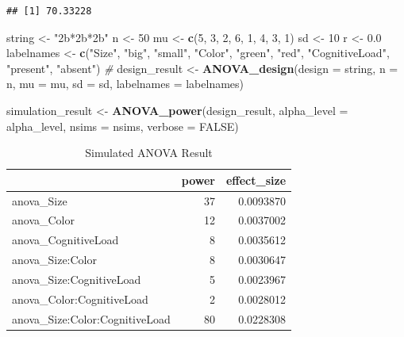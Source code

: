 \documentclass[]{book}
\newenvironment{Shaded}{\begin{snugshade}}{\end{snugshade}}
\newcommand{\CommentTok}[1]{\textcolor[rgb]{0.56,0.35,0.01}{\textit{#1}}}
\newcommand{\DataTypeTok}[1]{\textcolor[rgb]{0.13,0.29,0.53}{#1}}
\newcommand{\DecValTok}[1]{\textcolor[rgb]{0.00,0.00,0.81}{#1}}
\newcommand{\FloatTok}[1]{\textcolor[rgb]{0.00,0.00,0.81}{#1}}
\newcommand{\KeywordTok}[1]{\textcolor[rgb]{0.13,0.29,0.53}{\textbf{#1}}}
\newcommand{\NormalTok}[1]{#1}
\newcommand{\OtherTok}[1]{\textcolor[rgb]{0.56,0.35,0.01}{#1}}
\newcommand{\StringTok}[1]{\textcolor[rgb]{0.31,0.60,0.02}{#1}}
\begin{document}
\begin{verbatim}
## [1] 70.33228
\end{verbatim}

\begin{Shaded}
\begin{Highlighting}[]
\NormalTok{string <-}\StringTok{ "2b*2b*2b"}
\NormalTok{n <-}\StringTok{ }\DecValTok{50}
\NormalTok{mu <-}\StringTok{ }\KeywordTok{c}\NormalTok{(}\DecValTok{5}\NormalTok{, }\DecValTok{3}\NormalTok{, }\DecValTok{2}\NormalTok{, }\DecValTok{6}\NormalTok{, }\DecValTok{1}\NormalTok{, }\DecValTok{4}\NormalTok{, }\DecValTok{3}\NormalTok{, }\DecValTok{1}\NormalTok{) }
\NormalTok{sd <-}\StringTok{ }\DecValTok{10}
\NormalTok{r <-}\StringTok{ }\FloatTok{0.0}
\NormalTok{labelnames <-}\StringTok{ }\KeywordTok{c}\NormalTok{(}\StringTok{"Size"}\NormalTok{, }\StringTok{"big"}\NormalTok{, }\StringTok{"small"}\NormalTok{, }\StringTok{"Color"}\NormalTok{, }\StringTok{"green"}\NormalTok{, }\StringTok{"red"}\NormalTok{, }
                \StringTok{"CognitiveLoad"}\NormalTok{, }\StringTok{"present"}\NormalTok{, }\StringTok{"absent"}\NormalTok{) }\CommentTok{#}
\NormalTok{design_result <-}\StringTok{ }\KeywordTok{ANOVA_design}\NormalTok{(}\DataTypeTok{design =}\NormalTok{ string,}
                   \DataTypeTok{n =}\NormalTok{ n, }
                   \DataTypeTok{mu =}\NormalTok{ mu, }
                   \DataTypeTok{sd =}\NormalTok{ sd, }
                   \DataTypeTok{labelnames =}\NormalTok{ labelnames)}

\NormalTok{simulation_result <-}\StringTok{ }\KeywordTok{ANOVA_power}\NormalTok{(design_result, }
                                 \DataTypeTok{alpha_level =}\NormalTok{ alpha_level, }
                                 \DataTypeTok{nsims =}\NormalTok{ nsims,}
                                 \DataTypeTok{verbose =} \OtherTok{FALSE}\NormalTok{)}
\end{Highlighting}
\end{Shaded}

\begin{table}[t]

\caption{\label{tab:unnamed-chunk-145}Simulated ANOVA Result}
\centering
\begin{tabular}{l|r|r}
\hline
  & power & effect\_size\\
\hline
anova\_Size & 37 & 0.0093870\\
\hline
anova\_Color & 12 & 0.0037002\\
\hline
anova\_CognitiveLoad & 8 & 0.0035612\\
\hline
anova\_Size:Color & 8 & 0.0030647\\
\hline
anova\_Size:CognitiveLoad & 5 & 0.0023967\\
\hline
anova\_Color:CognitiveLoad & 2 & 0.0028012\\
\hline
anova\_Size:Color:CognitiveLoad & 80 & 0.0228308\\
\hline
\end{tabular}
\end{table}
\end{document}
